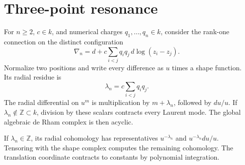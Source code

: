 \section{Three-point resonance}
\label{cbc:rc:subsec:resonance}

For \(n\geq2\), \(c\in k\), and numerical charges \(q_1,\ldots,q_n\in k\), consider the rank-one
connection on the distinct configuration
\[
 \nabla_n=d+c\sum_{i<j}q_iq_j\,d\log(z_i-z_j).
\]
Normalize two positions and write every difference as \(u\) times
a shape function.  Its radial residue is
\[
 \lambda_n=c\sum_{i<j}q_iq_j.
\]
The radial differential on \(u^m\) is multiplication by
\(m+\lambda_n\), followed by \(du/u\).
If \(\lambda_n\notin\mathbb Z\subset k\), division by these scalars
contracts every Laurent mode.  The global algebraic de Rham complex
is then acyclic.

If \(\lambda_n\in\mathbb Z\), its radial cohomology
has representatives \(u^{-\lambda_n}\) and
\(u^{-\lambda_n}du/u\).  Tensoring with the shape complex computes
the remaining cohomology.  The translation coordinate contracts to
constants by polynomial integration.

